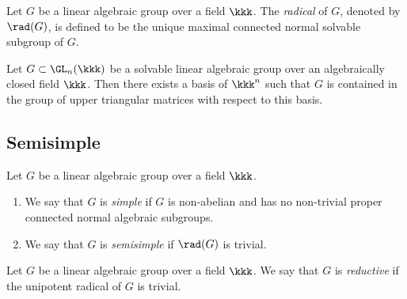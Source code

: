     \begin{definition}\label{def:radical_of_linear_algebraic_group}
        Let \(G\) be a linear algebraic group over a field \(\kkk\). 
        The \emph{radical} of \(G\), denoted by \(\rad(G)\), is defined to be the unique maximal connected normal solvable subgroup of \(G\).
    \end{definition}

    \begin{theorem}\label{thm:Lie-Kolchin_theorem}
        Let \(G \subset \GL_n(\kkk)\) be a solvable linear algebraic group over an algebraically closed field \(\kkk\). 
        Then there exists a basis of \(\kkk^n\) such that \(G\) is contained in the group of upper triangular matrices with respect to this basis.
    \end{theorem}

\subsection{Semisimple}

    \begin{definition}\label{def:simple_and_semisimple_algebraic_group}
        Let \(G\) be a linear algebraic group over a field \(\kkk\). 
        \begin{enumerate}
            \item We say that \(G\) is \emph{simple} if \(G\) is non-abelian and has no non-trivial proper connected normal algebraic subgroups.
            \item We say that \(G\) is \emph{semisimple} if \(\rad(G)\) is trivial.
        \end{enumerate}
    \end{definition}

    \begin{definition}\label{def:reductive_linear_algebraic_group}
        Let \(G\) be a linear algebraic group over a field \(\kkk\). 
        We say that \(G\) is \emph{reductive} if the unipotent radical of \(G\) is trivial.
        
    \end{definition}
